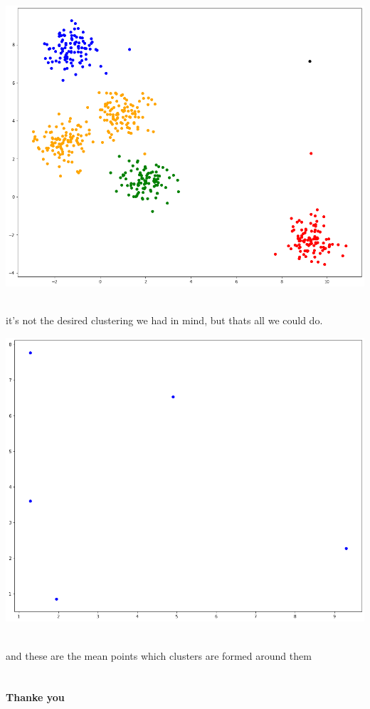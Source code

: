 \begin{landscape}
\vspace*{0cm}
\hspace*{-0.5cm}\includegraphics[width = 1 \linewidth]{clusters.png}
\hspace*{2cm}
\end{landscape}
\\it's not the desired clustering we had in mind, but thats all we could do.

\begin{landscape}
\vspace*{0cm}
\hspace*{-0.5cm}\includegraphics[width = 1 \linewidth]{means.png}
\hspace*{2cm}
\end{landscape}

\\and these are the mean points which clusters are formed around them
\\\;
\\\;
\\\textbf{Thanke you}
